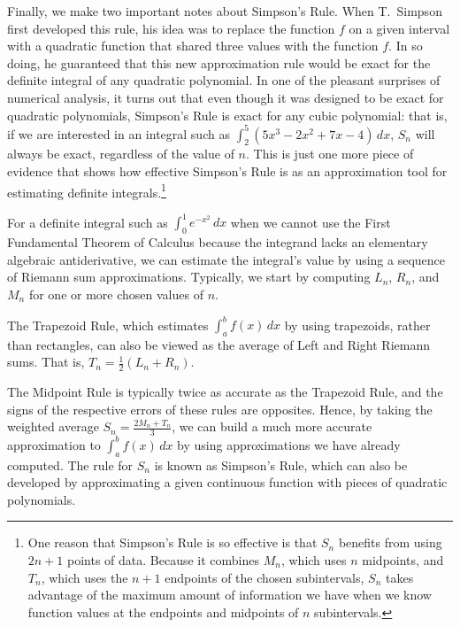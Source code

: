 Finally, we make two important notes about Simpson's Rule.  When T.~Simpson first developed this rule, his idea was to replace the function $f$ on a given interval with a quadratic function that shared three values with the function $f$.  In so doing, he guaranteed that this new approximation rule would be exact for the definite integral of any quadratic polynomial.  In one of the pleasant surprises of numerical analysis, it turns out that even though it was designed to be exact for quadratic polynomials, Simpson's Rule is exact for any cubic polynomial:  that is, if we are interested in an integral such as $\int_2^5 (5x^3 - 2x^2 + 7x - 4)\, dx$, $S_n$ will always be exact, regardless of the value of $n$.  This is just one more piece of evidence that shows how effective Simpson's Rule is as an approximation tool for estimating definite integrals.\footnote{One reason that Simpson's Rule is so effective is that $S_n$ benefits from using $2n+1$ points of data.  Because it combines $M_n$, which uses $n$ midpoints, and $T_n$, which uses the $n+1$ endpoints of the chosen subintervals, $S_n$ takes advantage of the maximum amount of information we have when we know function values at the endpoints and midpoints of $n$ subintervals.}

\begin{summary}
  \item For a definite integral such as $\int_0^1 e^{-x^2} \, dx$ when we cannot use the First Fundamental Theorem of Calculus because the integrand lacks an elementary algebraic antiderivative, we can estimate the integral's value by using a sequence of Riemann sum approximations.  Typically, we start by computing $L_n$, $R_n$, and $M_n$ for one or more chosen values of $n$.
  \item The Trapezoid Rule, which estimates $\int_a^b f(x) \, dx$ by using trapezoids, rather than rectangles, can also be viewed as the average of Left and Right Riemann sums.  That is, $T_n = \frac{1}{2}(L_n + R_n)$.  
  \item The Midpoint Rule is typically twice as accurate as the Trapezoid Rule, and the signs of the respective errors of these rules are opposites.  Hence, by taking the weighted average $S_n = \frac{2M_n + T_n}{3}$, we can build a much more accurate approximation to $\int_a^b f(x) \, dx$ by using approximations we have already computed.  The rule for $S_n$ is known as Simpson's Rule, which can also be developed by approximating a given continuous function with pieces of quadratic polynomials.
\end{summary}

\nin \hrulefill

 

\clearpage
